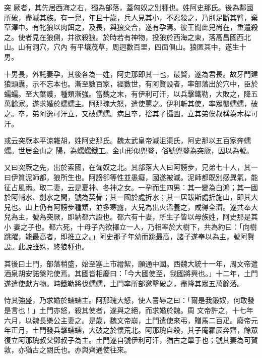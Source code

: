
\begin{pinyinscope}

 突
 厥者，其先居西海之右，獨為部落，蓋匈奴之別種也。姓阿史那氏。後為鄰國所破，盡滅其族。有一兒，年且十歲，兵人見其小，不忍殺之，乃刖足斷其臂，棄草澤中。有牝狼以肉餌之，及長，與狼交合，遂有孕焉。彼王聞此兒尚在，重遣殺之。使者見在狼側，并欲殺狼。於時若有神物，投狼於西海之東，落高昌國西北山。山有洞穴，穴內
 有平壤茂草，周迥數百里，四面俱山。狼匿其中，遂生十男。



 十男長，外託妻孕，其後各為一姓，阿史那即其一也，最賢，遂為君長。故牙門建狼頭纛，示不忘本也。漸至數百家，經數世，有阿賢設者，率部落出於穴中，臣於蠕蠕。至大葉護，種類漸強。當魏之末，有伊利可汗，以兵擊鐵勒，大敗之，降五萬餘家。遂求婚於蠕蠕主。阿那瑰大怒，遣使罵之。伊利斬其使，率眾襲蠕蠕，破之。卒，弟阿逸可汗立，又破蠕蠕。病且卒，捨其子攝圖，立其弟俟叔稱為木桿可汗。



 或云突厥本平涼雜胡，姓阿史那氏。魏太武皇帝滅沮渠氏，阿史那以五百家奔蠕蠕。世居金山之
 陽，為蠕蠕鐵工。金山形似兜鍪，俗號兜鍪為突厥，因以為號。



 又曰突厥之先，出於索國，在匈奴之北。其部落大人曰阿謗步，兄弟七十人，其一曰伊質泥師都，狼所生也。阿謗卻等性並愚癡，國遂被滅。泥師都既別感異氣，能征占風雨。取二妻，云是夏神、冬神之女。一孕而生四男：其一變為白鴻；其一國於阿輔水、劍水之間，號為契骨；其一國於處折水；其一居跋斯處折施山，即其大兒也。山上仍有阿謗步種類，並多寒露，大兒為出火溫養之，咸得全濟。遂共奉大兒為主，號為突厥，即納都六設也。都六有十妻，所生子皆以母族姓，阿史那是其小
 妻之子也。都六死，十母子內欲擇立一人，乃相率於大樹下，共為約曰：「向樹跳躍，能最高者，即推立之。」阿史那子年幼而跳最高，諸子遂奉以為主，號阿賢設。此說雖殊，終狼種也。



 其後曰土門，部落稍盛，始至塞上市繒絮，願通中國。西魏大統十一年，周文帝遣酒泉胡安諾槃陀使焉。其國皆相慶曰：「今大國使至，我國將興也。」十二年，土門遂遣使獻方物。時鐵勒將伐蠕蠕，土門率所部邀擊破之，盡降其眾五萬餘落。



 恃其強盛，乃求婚於蠕蠕主。阿那瑰大怒，使人詈辱之曰：「爾是我鍛奴，何敢發是言也！」土門亦怒，殺其使者，遂與之絕，而求婚於魏。周
 文帝許之，十七年六月，以魏長樂公主妻之。是歲，魏文帝崩，土門遣使來弔，贈馬二百疋。廢帝元年正月，土門發兵擊蠕蠕，大破之於懷荒北。阿那瑰自殺，其子庵羅辰奔齊，餘眾復立阿那瑰叔父鄧叔子為主。土門遂自號伊利可汗，猶古之單于也；號其妻為可賀敦，亦猶古之閼氏也。亦與齊通使往來。




\end{pinyinscope}
